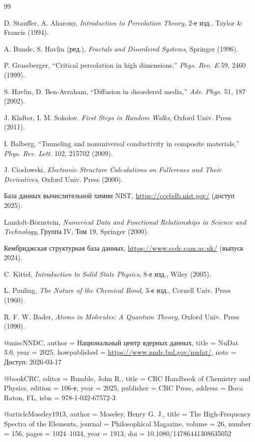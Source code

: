 \documentclass[12pt,a4paper]{article}
\theoremstyle{remark}
\begin{document}
	\begin{thebibliography}{99}
		
		
		D. Stauffer, A. Aharony, \emph{Introduction to Percolation Theory}, 2-е изд., Taylor \& Francis (1994).
		
		A. Bunde, S. Havlin (ред.), \emph{Fractals and Disordered Systems}, Springer (1996).
		
		P. Grassberger, ``Critical percolation in high dimensions,'' \emph{Phys. Rev. E} 59, 2460 (1999).
		
		S. Havlin, D. Ben-Avraham, ``Diffusion in disordered media,'' \emph{Adv. Phys.} 51, 187 (2002).
		
		J. Klafter, I. M. Sokolov, \emph{First Steps in Random Walks}, Oxford Univ. Press (2011).
		
		I. Balberg, ``Tunneling and nonuniversal conductivity in composite materials,'' \emph{Phys. Rev. Lett.} 102, 215702 (2009).
		
		J. Cioslowski, \emph{Electronic Structure Calculations on Fullerenes and Their Derivatives}, Oxford Univ. Press (2000).
		
		База данных вычислительной химии NIST, \url{https://cccbdb.nist.gov/} (доступ 2025).
		
		Landolt-Börnstein, \emph{Numerical Data and Functional Relationships in Science and Technology}, Группа IV, Том 19, Springer (2000).
		
		Кембриджская структурная база данных, \url{https://www.ccdc.cam.ac.uk/} (выпуск 2024).
		
		C. Kittel, \emph{Introduction to Solid State Physics}, 8-е изд., Wiley (2005).
		
		L. Pauling, \emph{The Nature of the Chemical Bond}, 3-е изд., Cornell Univ. Press (1960).
		
		R. F. W. Bader, \emph{Atoms in Molecules: A Quantum Theory}, Oxford Univ. Press (1990).
		
		@misc{NNDC,
			author       = {{Национальный центр ядерных данных}},
			title        = {NuDat 3.0},
			year         = {2025},
			howpublished = {\url{https://www.nndc.bnl.gov/nudat/}},
			note         = {Доступ: 2026-03-17}
		}
		
		@book{CRC,
			editor       = {Rumble, John R.},
			title        = {CRC Handbook of Chemistry and Physics},
			edition      = {106-е},
			year         = {2025},
			publisher    = {CRC Press},
			address      = {Boca Raton, FL},
			isbn         = {978-1-032-67572-3}
		}
		
		@article{Moseley1913,
			author       = {Moseley, Henry G. J.},
			title        = {The High-Frequency Spectra of the Elements},
			journal      = {Philosophical Magazine},
			volume       = {26},
			number       = {156},
			pages        = {1024--1034},
			year         = {1913},
			doi          = {10.1080/14786441308635052}
		}
	\end{thebibliography}
	
\end{document}
